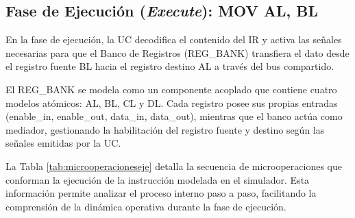 \documentclass[12pt,oneside]{templates/unerthesis}
\begin{document}
\hypertarget{fase-de-ejecuciuxf3n-execute-mov-al-bl}{%
\subsection{\texorpdfstring{Fase de Ejecución (\emph{Execute}): MOV AL, BL}{Fase de Ejecución (Execute): MOV AL, BL}}\label{fase-de-ejecuciuxf3n-execute-mov-al-bl}}

En la fase de ejecución, la UC decodifica el contenido del IR y activa las señales necesarias para que el Banco de Registros (REG\_BANK) transfiera el dato desde el registro fuente BL hacia el registro destino AL a través del bus compartido.

El REG\_BANK se modela como un componente acoplado que contiene cuatro modelos atómicos: AL, BL, CL y DL. Cada registro posee sus propias entradas (enable\_in, enable\_out, data\_in, data\_out), mientras que el banco actúa como mediador, gestionando la habilitación del registro fuente y destino según las señales emitidas por la UC.

La Tabla \ref{tab:microoperacioneseje} detalla la secuencia de microoperaciones que conforman la ejecución de la instrucción modelada en el simulador. Esta información permite analizar el proceso interno paso a paso, facilitando la comprensión de la dinámica operativa durante la fase de ejecución.
\end{document}
